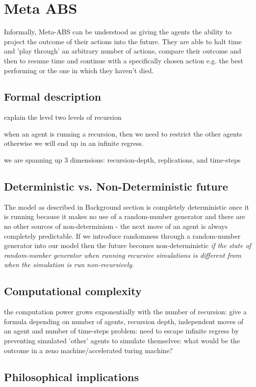 \section{Meta ABS}
Informally, Meta-ABS can be understood as giving the agents the ability to project the outcome of their actions into the future. They are able to halt time and 'play through' an arbitrary number of actions, compare their outcome and then to resume time and continue with a specifically chosen action e.g. the best performing or the one in which they haven't died.

\subsection{Formal description}
explain the level two levels of recursion

when an agent is running a recursion, then we need to restrict the other agents otherwise we will end up in an infinite regress.

we are spanning up 3 dimensions: recursion-depth, replications, and time-steps

\subsection{Deterministic vs. Non-Deterministic future}
The model as described in Background section is completely deterministic once it is running because it makes no use of a random-number generator and there are no other sources of non-determinism - the next move of an agent is always completely predictable. If we introduce randomness through a random-number generator into our model then the future becomes non-deterministic \textit{if the state of random-number generator when running recursive simulations is different from when the simulation is run non-recursively.}


\subsection{Computational complexity}
the computation power grows exponentially with the number of recursion: give a formula depending on number of agents, recursion depth, independent moves of an agent and number of time-steps 
problem: need to escape infinite regress by preventing simulated 'other' agents to simulate themselves: what would be the outcome in a zeno machine/accelerated turing machine?


\subsection{Philosophical implications}

